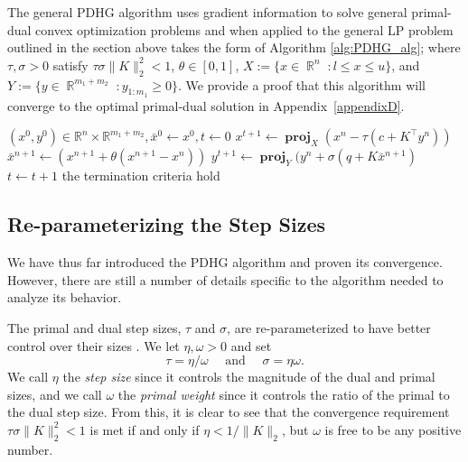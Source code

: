 \documentclass[twoside,12pt,openright]{report}  %
\DeclareMathOperator*{\proj}{\textbf{proj}}
\DeclareMathOperator*{\RR}{\mathbb{R}}
\begin{document}
The general PDHG algorithm uses gradient information to solve general primal-dual convex optimization problems and when applied to the general LP problem outlined in the section above takes the form of Algorithm \ref{alg:PDHG_alg}; where $\tau,\sigma >0$ satisfy $\tau\sigma \|K\|_2^2 <1$, $\theta \in [0,1]$, $X:=\{x \in \RR^n \; :l \leq x \leq u\}$, and $Y:=\{y\in \RR^{m_1+m_2} \; : y_{1:m_1} \geq 0\}$.
We provide a proof that this algorithm will converge to the optimal primal-dual solution in Appendix~\ref{appendixD}.


\begin{algorithm}
\begin{algorithmic}[1]
\caption{PDHG Algorithm for Linear Programming \cite{applegate2}}
\label{alg:PDHG_alg}
    \Require $(x^0,y^0) \in \mathbb{R}^n \times \mathbb{R}^{m_1+m_2}, \bar{x}^0 \leftarrow x^0, t \leftarrow 0$
    \Repeat 
    \State $x^{t+1} \leftarrow \proj_{X}(x^n-\tau(c+ K^\top y^n))$
    \State $\bar{x}^{n+1} \leftarrow (x^{n+1} + \theta(x^{n+1}- x^n))$
    \State $y^{t+1} \leftarrow \proj_{Y}(y^n+\sigma(q +  K \bar{x}^{n+1})$
    \State $t \leftarrow t + 1$
    \Until the termination criteria hold
    
\end{algorithmic}
\end{algorithm}

\subsection{Re-parameterizing the Step Sizes}
We have thus far introduced the PDHG algorithm and proven its convergence. However, there are still a number of details specific to the algorithm needed to analyze its behavior.

The primal and dual step sizes, $\tau$ and $\sigma$, are re-parameterized to have better control over their sizes \cite{applegate2}. We let $\eta,\omega >0$ and set \[ \tau=\eta/\omega \quad \text{ and } \quad \sigma=\eta\omega.\]
We call $\eta$ the \textit{step size} since it controls the magnitude of the dual and primal sizes, and we call $\omega$ the \textit{primal weight} since it controls the ratio of the primal to the dual step size. From this, it is clear to see that the convergence requirement $\tau\sigma\|K\|_2^2 <1$ is met if and only if $\eta < 1/\|K\|_2$, but $\omega$ is free to be any positive number.
\end{document}
